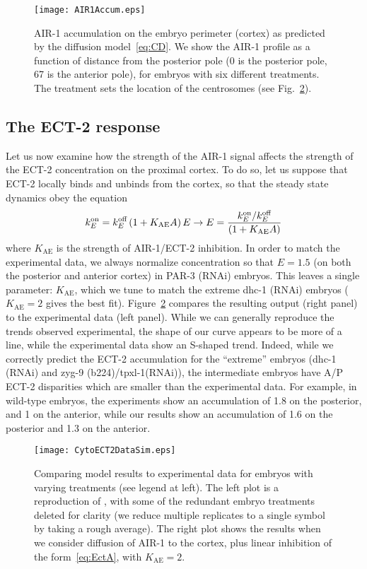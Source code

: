 \documentclass[11pt]{article}
\begin{document}
\begin{figure}
\centering
\texttt{[image: AIR1Accum.eps]}
\caption{\label{fig:AIR1Acc}AIR-1 accumulation on the embryo perimeter (cortex) as predicted by the diffusion model\ \eqref{eq:CD}. We show the AIR-1 profile as a function of distance from the posterior pole (0 is the posterior pole, 67 is the anterior pole), for embryos with six different treatments. The treatment sets the location of the centrosomes (see Fig.\ \ref{fig:DiffCSep}).}
\end{figure}

\subsection{The ECT-2 response}
Let us now examine how the strength of the AIR-1 signal affects the strength of the ECT-2 concentration on the proximal cortex. To do so, let us suppose that ECT-2 locally binds and unbinds from the cortex, so that the steady state dynamics obey the equation
\begin{equation}
\label{eq:EctA}
 k^\text{on}_E = k^\text{off}_E \left(1+K_\text{AE}A\right)E \rightarrow E = \frac{k^\text{on}_E/ k^\text{off}_E}{ \left(1+K_\text{AE}A\right)}
\end{equation}
where $K_\text{AE}$ is the strength of AIR-1/ECT-2 inhibition. In order to match the experimental data, we always normalize concentration so that $E=1.5$ (on both the posterior and anterior cortex) in PAR-3 (RNAi) embryos. This leaves a single parameter: $K_\text{AE}$, which we tune to match the extreme dhc-1 (RNAi) embryos ($K_\text{AE}=2$ gives the best fit). Figure\ \ref{fig:DiffCSep} compares the resulting output (right panel) to the experimental data (left panel). While we can generally reproduce the trends observed experimental, the shape of our curve appears to be more of a line, while the experimental data show an S-shaped trend. Indeed, while we correctly predict the ECT-2 accumulation for the ``extreme'' embryos (dhc-1 (RNAi) and zyg-9 (b224)/tpxl-1(RNAi)), the intermediate embryos have A/P ECT-2 disparities which are smaller than the experimental data. For example, in wild-type embryos, the experiments show an accumulation of 1.8 on the posterior, and 1 on the anterior, while our results show an accumulation of 1.6 on the posterior and 1.3 on the anterior. 

\begin{figure}
\centering
\texttt{[image: CytoECT2DataSim.eps]}
\caption{\label{fig:DiffCSep} Comparing model results to experimental data for embryos with varying treatments (see legend at left). The left plot is a reproduction of \cite[Fig.~7A]{longhini2022aurora}, with some of the redundant embryo treatments deleted for clarity (we reduce multiple replicates to a single symbol by taking a rough average). The right plot shows the results when we consider diffusion of AIR-1 to the cortex, plus linear inhibition of the form\ \eqref{eq:EctA}, with $K_\text{AE}=2$. }
\end{figure}
\end{document}
